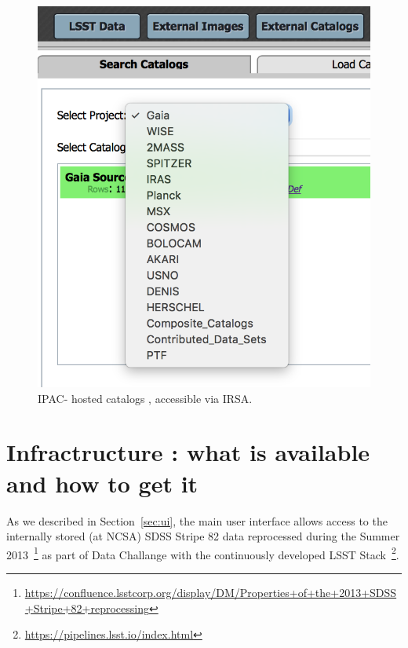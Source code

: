 \documentclass[fleqn,usenatbib]{mnras} %
\begin{document}
\begin{figure}
\includegraphics[width=\columnwidth]{figs/2_PDAC_externals}
\caption{IPAC- hosted catalogs , accessible via IRSA. }
\label{fig:PDAC_external_cat}
\end{figure}




\section{Infractructure : what is available and how to get it }
\label{sec:infra}


As we described in Section~\ref{sec:ui}, the main user interface allows access to the internally stored (at NCSA) SDSS Stripe 82 data reprocessed during the Summer 2013~\footnote{\url{https://confluence.lsstcorp.org/display/DM/Properties+of+the+2013+SDSS+Stripe+82+reprocessing}} as part of Data Challange with the continuously developed LSST Stack~\footnote{\url{https://pipelines.lsst.io/index.html}}. 
\end{document}
